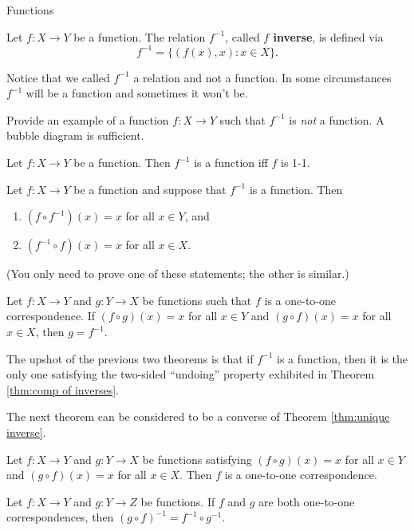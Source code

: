 \begin{section}{Functions}
\begin{definition}
Let $f:X\to Y$ be a function.  The relation $f^{-1}$, called \textbf{$f$ inverse}, is defined via
\[
f^{-1}=\{(f(x),x):x\in X\}.
\]
\end{definition}

\begin{remark}
Notice that we called $f^{-1}$ a relation and not a function.  In some circumstances $f^{-1}$ will be a function and sometimes it won't be.
\end{remark}

\begin{exercise}
Provide an example of a function $f:X\to Y$ such that $f^{-1}$ is \emph{not} a function.  A bubble diagram is sufficient.
\end{exercise}

\begin{theorem}
Let $f:X\to Y$ be a function.  Then $f^{-1}$ is a function iff $f$ is 1-1.
\end{theorem}

\begin{theorem}\label{thm:comp of inverses}
Let $f:X\to Y$ be a function and suppose that $f^{-1}$ is a function.  Then
\begin{enumerate}
\item $(f\circ f^{-1})(x)=x$ for all $x\in Y$, and
\item $(f^{-1}\circ f)(x)=x$ for all $x\in X$.
\end{enumerate}
(You only need to prove one of these statements; the other is similar.)
\end{theorem}

\begin{theorem}\label{thm:unique inverse}
Let $f:X\to Y$ and $g:Y\to X$ be functions such that $f$ is a one-to-one correspondence.  If $(f\circ g)(x)=x$ for all $x\in Y$ and $(g\circ f)(x)=x$ for all $x\in X$, then $g=f^{-1}$.
\end{theorem}

\begin{remark}
The upshot of the previous two theorems is that if $f^{-1}$ is a function, then it is the only one satisfying the two-sided ``undoing'' property exhibited in Theorem \ref{thm:comp of inverses}.
\end{remark}

The next theorem can be considered to be a converse of Theorem \ref{thm:unique inverse}.

\begin{theorem}
Let $f:X\to Y$ and $g:Y\to X$ be functions satisfying $(f\circ g)(x)=x$ for all $x\in Y$ and $(g\circ f)(x)=x$ for all $x\in X$.  Then $f$ is a one-to-one correspondence.
\end{theorem}

\begin{theorem}
Let $f:X\to Y$ and $g:Y\to Z$ be functions.  If $f$ and $g$ are both one-to-one correspondences, then $(g\circ f)^{-1}=f^{-1}\circ g^{-1}$.
\end{theorem}

\end{section}

